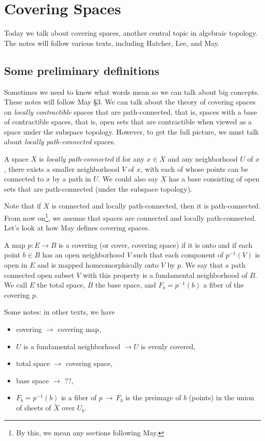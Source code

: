 \section{Covering Spaces}
Today we talk about covering spaces, another central topic in algebraic topology. The notes will follow various texts, including Hatcher, Lee, and May.
\orbreak
\subsection{Some preliminary definitions}
Sometimes we need to know what words mean so we can talk about big concepts. These notes will follow May \S 3. We can talk about the theory of covering spaces on \emph{locally contractible} spaces that are path-connected, that is, spaces with a base of contractible spaces, that is, open sets that are contractible when viewed as a space under the subspace topology. However, to get the full picture, we must talk about \emph{locally path-connected} spaces. 
\begin{definition}
    A space $X$ is \emph{locally path-connected} if for any $x\in X$ and any neighborhood $U$ of $x$, there exists a smaller neighborhood $V$ of $x$, with each of whose points can be connected to $x$ by a path in $U$. We could also say $X$ has a base consisting of open sets that are path-connected (under the subspace topology).
\end{definition}
Note that if $X$ is connected and locally path-connected, then it is path-connected. From now on\footnote{By this, we mean any sections following May.}, we assume that spaces are connected and locally path-connected. Let's look at how May defines covering spaces.
\begin{definition}
    A map $p \colon E \to B$ is a covering (or cover, covering space) if it is onto and if each point $b\in B$ has an open neighborhood $V$ such that each component of $p^{-1}(V)$ is open in $E$ and is mapped homeomorphically onto $V$ by $p$. We say that a path connected open subset $V$ with this property is a fundamental neighborhood of $B$. We call $E$ the total space, $B$ the base space, and $F_b = p ^{-1}(b)$ a fiber of the covering $p$.
\end{definition}
Some notes: in other texts, we have
\begin{itemize}
    \item covering $\rightarrow $ covering map,
    \item $U$ is a fundamental neighborhood $\rightarrow U$ is evenly covered,
    \item total space $\rightarrow $ covering space,
    \item base space $\rightarrow $ ??,
    \item $F_b=p^{-1}(b)$ is a fiber of $p \,\longrightarrow\, F_b$ is the preimage of $b$ (points) in the union of sheets of $\widetilde X$ over $U_b$.
\end{itemize}   

